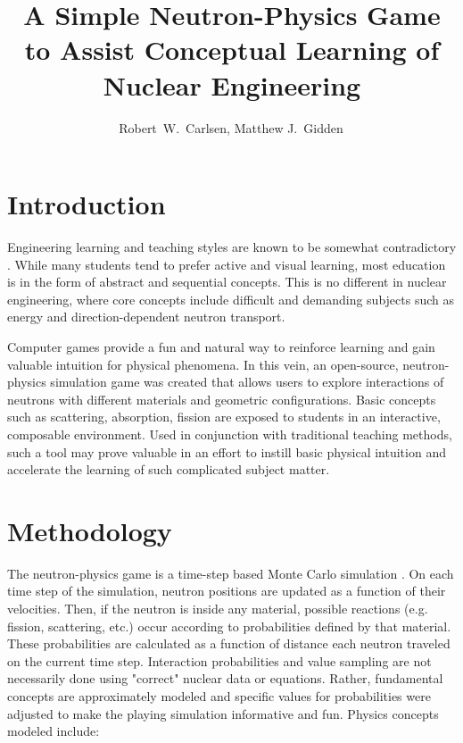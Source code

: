 \documentclass{anstrans}
\title{A Simple Neutron-Physics Game to Assist Conceptual Learning of Nuclear
  Engineering}
\author{Robert~W.~Carlsen, Matthew J.~Gidden$^{\*}$}
\institute{
University of Wisconsin, Nuclear Engineering Dept., 1500 Engineering Dr., Madison, WI
}
\begin{document}
\section{Introduction}

Engineering learning and teaching styles are known to be somewhat contradictory
\cite{felder2000learning}. While many students tend to prefer active and visual
learning, most education is in the form of abstract and sequential
concepts. This is no different in nuclear engineering, where core concepts
include difficult and demanding subjects such as energy and direction-dependent
neutron transport. 

Computer games provide a fun and natural way to reinforce learning and gain
valuable intuition for physical phenomena. In this vein, an open-source,
neutron-physics simulation game was created \cite{Carlsen2015} that allows users
to explore interactions of neutrons with different materials and geometric
configurations. Basic concepts such as scattering, absorption, fission are
exposed to students in an interactive, composable environment. Used in
conjunction with traditional teaching methods, such a tool may prove valuable in
an effort to instill basic physical intuition and accelerate the learning of
such complicated subject matter.

\section{Methodology}

The neutron-physics game is a time-step based Monte Carlo
simulation \cite{lewis1984computational}. On each time step of the simulation,
neutron positions are updated as a function of their velocities.  Then, if the
neutron is inside any material, possible reactions (e.g. fission, scattering,
etc.)  occur according to probabilities defined by that material.  These
probabilities are calculated as a function of distance each neutron traveled on
the current time step.  Interaction probabilities and value sampling are not
necessarily done using "correct" nuclear data or equations.  Rather, fundamental
concepts are approximately modeled and specific values for probabilities were
adjusted to make the playing simulation informative and fun.  Physics concepts
modeled include:
\end{document}
